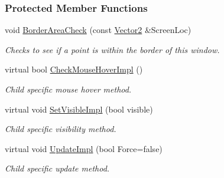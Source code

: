 \subsubsection*{Protected Member Functions}
\begin{DoxyCompactItemize}
\item 
\hypertarget{classMezzanine_1_1UI_1_1Window_ad05b33cf75af2a12de46caddbc9ecbdd}{
void \hyperlink{classMezzanine_1_1UI_1_1Window_ad05b33cf75af2a12de46caddbc9ecbdd}{BorderAreaCheck} (const \hyperlink{classMezzanine_1_1Vector2}{Vector2} \&ScreenLoc)}
\label{classMezzanine_1_1UI_1_1Window_ad05b33cf75af2a12de46caddbc9ecbdd}

\begin{DoxyCompactList}\small\item\em Checks to see if a point is within the border of this window. \item\end{DoxyCompactList}\item 
\hypertarget{classMezzanine_1_1UI_1_1Window_a1c05bf2a6100cdde795388ba8a106b60}{
virtual bool \hyperlink{classMezzanine_1_1UI_1_1Window_a1c05bf2a6100cdde795388ba8a106b60}{CheckMouseHoverImpl} ()}
\label{classMezzanine_1_1UI_1_1Window_a1c05bf2a6100cdde795388ba8a106b60}

\begin{DoxyCompactList}\small\item\em Child specific mouse hover method. \item\end{DoxyCompactList}\item 
\hypertarget{classMezzanine_1_1UI_1_1Window_aadcd6321ca24c60f4de49c9398c7e5bd}{
virtual void \hyperlink{classMezzanine_1_1UI_1_1Window_aadcd6321ca24c60f4de49c9398c7e5bd}{SetVisibleImpl} (bool visible)}
\label{classMezzanine_1_1UI_1_1Window_aadcd6321ca24c60f4de49c9398c7e5bd}

\begin{DoxyCompactList}\small\item\em Child specific visibility method. \item\end{DoxyCompactList}\item 
\hypertarget{classMezzanine_1_1UI_1_1Window_a9c02d827c3778f94e1f8ed58264b1c72}{
virtual void \hyperlink{classMezzanine_1_1UI_1_1Window_a9c02d827c3778f94e1f8ed58264b1c72}{UpdateImpl} (bool Force=false)}
\label{classMezzanine_1_1UI_1_1Window_a9c02d827c3778f94e1f8ed58264b1c72}

\begin{DoxyCompactList}\small\item\em Child specific update method. \item\end{DoxyCompactList}\end{DoxyCompactItemize}
